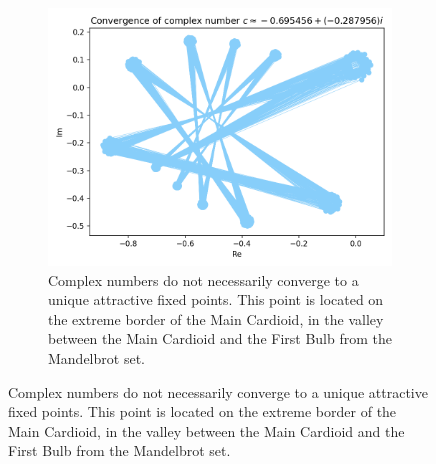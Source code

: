 \documentclass{article}
\begin{document}
\begin{figure}[h]
        \begin{subfigure}[t]{.47\linewidth}
            \includegraphics[width=\textwidth]{pictures/appendix/multiple_fixed_points_c.png}
            \caption{Complex numbers do not necessarily converge to a unique attractive fixed points. This point is located on the extreme border of the Main Cardioid, in the valley between the Main Cardioid and the First Bulb from the Mandelbrot set.}
            \label{fig:complex_points_convergence_multiple}
        \end{subfigure}
    \end{figure}
\end{document}
